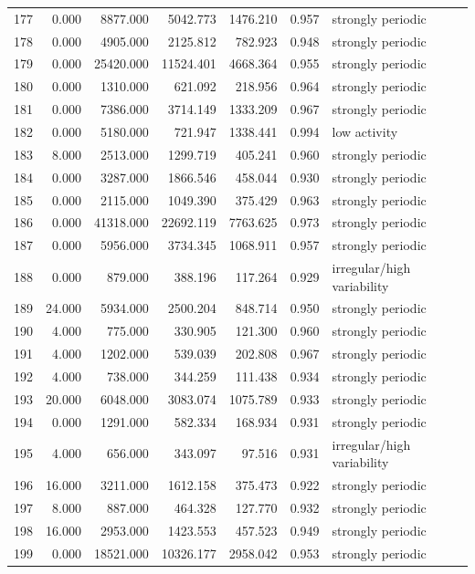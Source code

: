 \begin{longtable}{lrrrrrl}
177 & 0.000 & 8877.000 & 5042.773 & 1476.210 & 0.957 & strongly periodic \\
178 & 0.000 & 4905.000 & 2125.812 & 782.923 & 0.948 & strongly periodic \\
179 & 0.000 & 25420.000 & 11524.401 & 4668.364 & 0.955 & strongly periodic \\
180 & 0.000 & 1310.000 & 621.092 & 218.956 & 0.964 & strongly periodic \\
181 & 0.000 & 7386.000 & 3714.149 & 1333.209 & 0.967 & strongly periodic \\
182 & 0.000 & 5180.000 & 721.947 & 1338.441 & 0.994 & low activity \\
183 & 8.000 & 2513.000 & 1299.719 & 405.241 & 0.960 & strongly periodic \\
184 & 0.000 & 3287.000 & 1866.546 & 458.044 & 0.930 & strongly periodic \\
185 & 0.000 & 2115.000 & 1049.390 & 375.429 & 0.963 & strongly periodic \\
186 & 0.000 & 41318.000 & 22692.119 & 7763.625 & 0.973 & strongly periodic \\
187 & 0.000 & 5956.000 & 3734.345 & 1068.911 & 0.957 & strongly periodic \\
188 & 0.000 & 879.000 & 388.196 & 117.264 & 0.929 & irregular/high variability \\
189 & 24.000 & 5934.000 & 2500.204 & 848.714 & 0.950 & strongly periodic \\
190 & 4.000 & 775.000 & 330.905 & 121.300 & 0.960 & strongly periodic \\
191 & 4.000 & 1202.000 & 539.039 & 202.808 & 0.967 & strongly periodic \\
192 & 4.000 & 738.000 & 344.259 & 111.438 & 0.934 & strongly periodic \\
193 & 20.000 & 6048.000 & 3083.074 & 1075.789 & 0.933 & strongly periodic \\
194 & 0.000 & 1291.000 & 582.334 & 168.934 & 0.931 & strongly periodic \\
195 & 4.000 & 656.000 & 343.097 & 97.516 & 0.931 & irregular/high variability \\
196 & 16.000 & 3211.000 & 1612.158 & 375.473 & 0.922 & strongly periodic \\
197 & 8.000 & 887.000 & 464.328 & 127.770 & 0.932 & strongly periodic \\
198 & 16.000 & 2953.000 & 1423.553 & 457.523 & 0.949 & strongly periodic \\
199 & 0.000 & 18521.000 & 10326.177 & 2958.042 & 0.953 & strongly periodic \\

\end{longtable}

